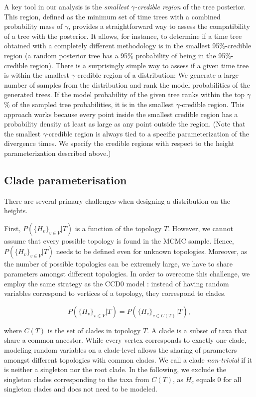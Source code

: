 \documentclass[10pt,letterpaper]{article}
\newcommand{\Pro}[1]{P\left(#1\right)}
\begin{document}
A key tool in our analysis is the \emph{smallest $\gamma$-credible region} of the tree posterior. This region, defined as the minimum set of time trees with a combined probability mass of $\gamma$, provides a straightforward way to assess the compatibility of a tree with the posterior. It allows, for instance, to determine if a time tree obtained with a completely different methodology is in the smallest 95\%-credible region (a random posterior tree has a 95\% probability of being in the 95\%-credible region). There is a surprisingly simple way to assess if a given time tree is within the smallest $\gamma$-credible region of a distribution: We generate a large number of samples from the distribution and rank the model probabilities of the generated trees. If the model probability of the given tree ranks within the top $\gamma$\% of the sampled tree probabilities, it is in the smallest $\gamma$-credible region. This approach works because every point inside the smallest credible region has a probability density at least as large as any point outside the region. (Note that the smallest $\gamma$-credible region is always tied to a specific parameterization of the divergence times. We specify the credible regions with respect to the height parameterization described above.)

\subsection*{Clade parameterisation}

There are several primary challenges when designing a distribution on the heights.

First, $P\left(\{H_v\}_{v \in V} | T\right)$ is a function of the topology $T$. However, we cannot assume that every possible topology is found in the MCMC sample. Hence, $P\left(\{H_v\}_{v \in V} | T\right)$ needs to be defined even for unknown topologies. Moreover, as the number of possible topologies can be extremely large, we have to share parameters amongst different topologies. In order to overcome this challenge, we employ the same strategy as the CCD0 model \cite{ccd}: instead of having random variables correspond to vertices of a topology, they correspond to clades.

$$
\Pro{\{H_v\}_{v \in V} | T} = \Pro{\{H_c\}_{c \in C(T)} | T},
$$

where $C(T)$ is the set of clades in topology $T$. A clade is a subset of taxa that share a common ancestor. While every vertex corresponds to exactly one clade, modeling random variables on a clade-level allows the sharing of parameters amongst different topologies with common clades. We call a clade \emph{non-trivial} if it is neither a singleton nor the root clade. In the following, we exclude the singleton clades corresponding to the taxa from $C(T)$, as $H_c$ equals $0$ for all singleton clades and does not need to be modeled. 
\end{document}
